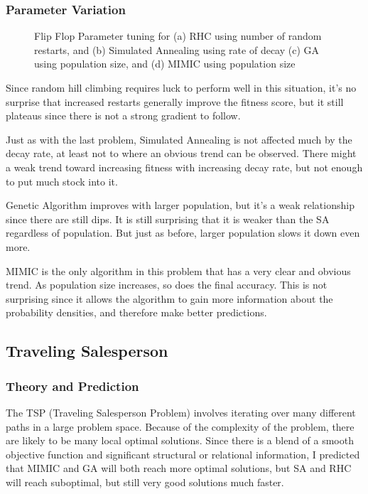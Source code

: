 \documentclass[
	letterpaper, %
]{mlreport}
\begin{document}
\subsubsection{Parameter Variation}
\begin{figure}
	\centering
	\caption{Flip Flop Parameter tuning for (a) RHC using number of random restarts, and (b) Simulated Annealing using rate of decay (c) GA using population size, and (d) MIMIC using population size}
	\label{fig:fig4}
\end{figure}
Since random hill climbing requires luck to perform well in this situation, it's no surprise that increased restarts generally improve the fitness score, but it still plateaus since there is not a strong gradient to follow.

Just as with the last problem, Simulated Annealing is not affected much by the decay rate, at least not to where an obvious trend can be observed. There might a weak trend toward increasing fitness with increasing decay rate, but not enough to put much stock into it.

Genetic Algorithm improves with larger population, but it's a weak relationship since there are still dips. It is still surprising that it is weaker than the SA regardless of population. But just as before, larger population slows it down even more.

MIMIC is the only algorithm in this problem that has a very clear and obvious trend. As population size increases, so does the final accuracy. This is not surprising since it allows the algorithm to gain more information about the probability densities, and therefore make better predictions.

\subsection{Traveling Salesperson}
\subsubsection{Theory and Prediction}
The TSP (Traveling Salesperson Problem) involves iterating over many different paths in a large problem space. Because of the complexity of the problem, there are likely to be many local optimal solutions. Since there is a blend of a smooth objective function and significant structural or relational information, I predicted that MIMIC and GA will both reach more optimal solutions, but SA and RHC will reach suboptimal, but still very good solutions much faster.
\end{document}
